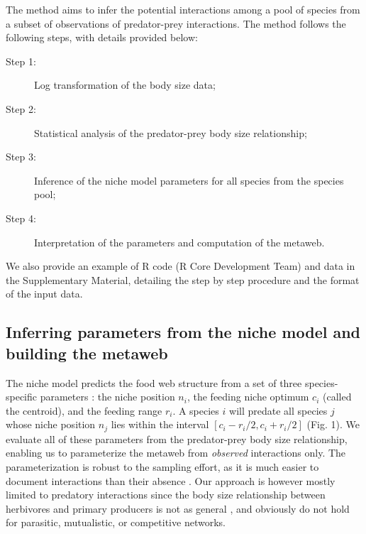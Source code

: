 \documentclass[12pt]{article}
\begin{document}
The method aims to infer the potential interactions among a pool of species from
a subset of observations of predator-prey interactions. The method follows the
following steps, with details provided below:
\begin{description}
\item[Step 1:] Log transformation of the body size data;
\item[Step 2:] Statistical analysis of the predator-prey body size relationship;
\item[Step 3:] Inference of the niche model parameters for all species from the species pool;
\item[Step 4:] Interpretation of the parameters and computation of the metaweb.
\end{description}
We also provide an example of R code (R Core Development Team) and data in the Supplementary Material, detailing the step by step procedure and the format of the input data. 

\subsection{Inferring parameters from the niche model and building the metaweb}

The niche model predicts the food web structure from a set of three
species-specific parameters \parencite{Williams2000}: the niche position $n_i$,
the feeding niche optimum $c_i$ (called the centroid), and the feeding range
$r_i$. A species $i$ will predate all species $j$ whose niche position $n_j$
lies within the interval $[c_i-r_i/2,c_i+r_i/2]$ (Fig. 1). We evaluate all of
these parameters from the predator-prey body size relationship, enabling us to
parameterize the metaweb from \emph{observed} interactions only. The
parameterization is robust to the sampling effort, as it is much easier to
document interactions than their absence \parencite{Martinez1999}. Our approach
is however mostly limited to predatory interactions since the body size
relationship between herbivores and primary producers is not as general
\parencite{Riede2010}, and obviously do not hold for parasitic, mutualistic, or
competitive networks.
\end{document}
